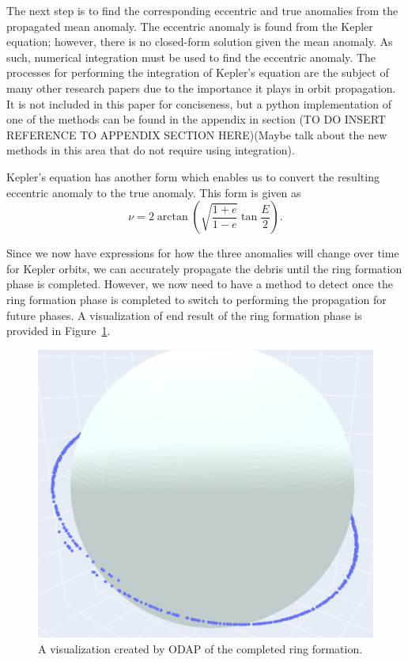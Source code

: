 \documentclass[a4paper, 12pt]{article}
\begin{document}
The next step is to find the corresponding eccentric and true anomalies from the propagated mean anomaly. The eccentric anomaly is found from the Kepler equation; however, there is no closed-form solution given the mean anomaly. As such, numerical integration must be used to find the eccentric anomaly. The processes for performing the integration of Kepler's equation are the subject of many other research papers due to the importance it plays in orbit propagation. It is not included in this paper for conciseness, but a python implementation of one of the methods can be found in the appendix in section (TO DO INSERT REFERENCE TO APPENDIX SECTION HERE)(Maybe talk about the new methods in this area that do not require using integration).

Kepler's equation has another form which enables us to convert the resulting eccentric anomaly to the true anomaly. This form is given as
\begin{equation}
	\nu = 2 \arctan\left(\sqrt{\frac{1+e}{1-e}}\tan\frac{E}{2}\right).
\end{equation}

Since we now have expressions for how the three anomalies will change over time for Kepler orbits, we can accurately propagate the debris until the ring formation phase is completed. However, we now need to have a method to detect once the ring formation phase is completed to switch to performing the propagation for future phases. A visualization of end result of the ring formation phase is provided in Figure~\ref{ring}.
\begin{figure}[b!]
	\centering
	\includegraphics[scale=0.45]{ring_phase}
	\caption{A visualization created by ODAP of the completed ring formation.}
	\label{ring}
\end{figure}
\end{document}
